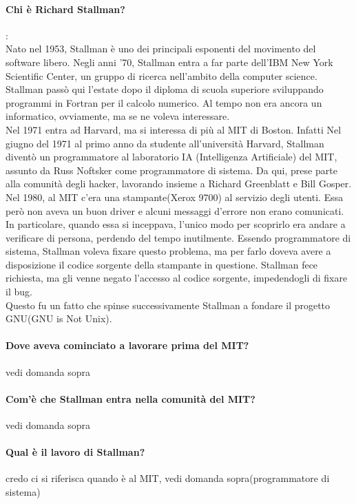 \documentclass[a4paper]{article}
\begin{document}
		\paragraph{Chi è Richard Stallman?}: \\
		Nato nel 1953, Stallman è uno dei principali esponenti del movimento del software libero.
		Negli anni '70, Stallman entra a far parte dell'IBM New York Scientific Center, un gruppo di ricerca nell'ambito della computer science. Stallman passò qui l'estate dopo il diploma di scuola superiore sviluppando programmi in Fortran per il calcolo numerico. Al tempo non era ancora un informatico, ovviamente, ma se ne voleva interessare.\\
		Nel 1971 entra ad Harvard, ma si interessa di più al MIT di Boston. Infatti Nel giugno del 1971 al primo anno da studente all'università Harvard, Stallman diventò un programmatore al laboratorio IA (Intelligenza Artificiale) del MIT, assunto da Russ Noftsker come programmatore di sistema. Da qui, prese parte alla comunità degli hacker, lavorando insieme a Richard Greenblatt e Bill Gosper. \\
		Nel 1980, al MIT c'era una stampante(Xerox 9700) al servizio degli utenti. Essa però non aveva un buon driver e alcuni messaggi d'errore non erano comunicati. In particolare, quando essa si inceppava, l'unico modo per scoprirlo era andare a verificare di persona, perdendo del tempo inutilmente. Essendo programmatore di sistema, Stallman voleva fixare questo problema, ma per farlo doveva avere a disposizione il codice sorgente della stampante in questione. Stallman fece richiesta, ma gli venne negato l'accesso al codice sorgente, impedendogli di fixare il bug.\\
		Questo fu un fatto che spinse successivamente Stallman a fondare il progetto GNU(GNU is Not Unix).
		
		\paragraph{Dove aveva cominciato a lavorare prima del MIT?}
		vedi domanda sopra
		\paragraph{Com'è che Stallman entra nella comunità del MIT?}
		vedi domanda sopra
		\paragraph{Qual è il lavoro di Stallman?}
		credo ci si riferisca quando è al MIT, vedi domanda sopra(programmatore di sistema)
\end{document}
